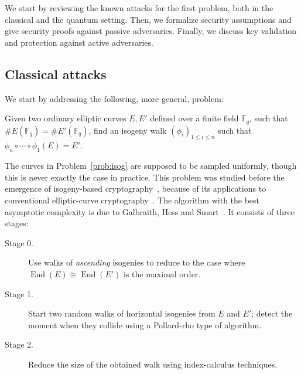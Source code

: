 \documentclass{llncs}
\newcommand{\F}{\mathbb{F}}
\DeclareMathOperator{\End}{End}
\begin{document}
We start by reviewing the known attacks for the first problem, both in
the classical and the quantum setting. Then, we formalize security
assumptions and give security proofs against passive adversaries.
Finally, we discuss key validation and protection against active
adversaries.

\subsection{Classical attacks}
\label{sec:classical-attacks}

We start by addressing the following, more general, problem:

\begin{problem}
\label{prob:isog}
  Given two ordinary elliptic curves $E,E'$ defined over a finite
  field $\F_q$, such that $\#E(\F_q)=\#E'(\F_q)$, find an isogeny walk
  $(ϕ_i)_{1≤i≤n}$ such that $ϕ_n∘\cdots∘ϕ_1(E)=E'$.
\end{problem}

The curves in Problem~\ref{prob:isog} are supposed to be sampled
uniformly, though this is never exactly the case in practice.
This problem was studied before the emergence of
isogeny-based cryptography~\cite{Gal,GHS,galbraith+stolbunov11},
because of its applications to conventional elliptic-curve
cryptography~\cite{GHS,teske06,jao+miller+venkatesan09}.
The algorithm with the best asymptotic complexity is due to Galbraith,
Hess and Smart~\cite{GHS}. It consists of three stages:
\begin{description}
\item[Stage 0.] Use walks of \emph{ascending} isogenies to reduce to the case where
  $\End(E)\cong\End(E')$ is the maximal order.
\item[Stage 1.] Start two random walks of horizontal isogenies 
  from $E$ and $E'$; detect the
  moment when they collide using a Pollard-rho type of algorithm.
\item[Stage 2.] Reduce the size of the obtained walk using
  index-calculus techniques.
\end{description}
\end{document}
